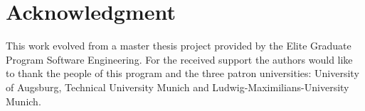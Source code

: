 \documentclass[conference]{IEEEtran}
\begin{document}


\section*{Acknowledgment}

This work evolved from a master thesis project provided by the Elite Graduate Program Software Engineering. 
For the received support the authors would like to thank the people of this program and the three patron universities: University of Augsburg, Technical University Munich and Ludwig-Maximilians-University Munich.


\end{document}

